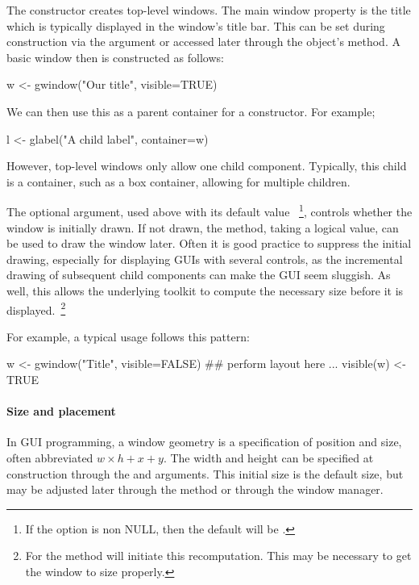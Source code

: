 The  constructor creates top-level windows. The
main window property is the title which is typically displayed in the
window's title bar. This can be set during construction via the
 argument or accessed later through the object's
 method. A basic window then is constructed as follows:

\begin{Schunk}
\begin{Sinput}
 w <- gwindow("Our title", visible=TRUE)
\end{Sinput}
\end{Schunk}
%

We can then use this as a parent container for a constructor. For example;
\begin{Schunk}
\begin{Sinput}
 l <- glabel("A child label", container=w)
\end{Sinput}
\end{Schunk}
%
However, top-level windows only allow one child component. Typically,
this child is a container, such as a box container, allowing for
multiple children.


The optional  argument, used above with its
default value ~\footnote{If the option
   is non NULL, then
  the default will be .}, controls whether the window is
initially drawn. If not drawn, the 
method, taking a logical value, can be used to draw the window later.
Often it is good practice to suppress the initial drawing, especially
for displaying GUIs with several controls, as the incremental drawing
of subsequent child components can make the GUI seem sluggish. As
well, this allows the underlying toolkit to compute the necessary size
before it is displayed.~\footnote{For  the 
method will initiate this recomputation. This may be necessary to get the
window to size properly.}

For example, a typical usage follows this pattern:
\begin{Schunk}
\begin{Sinput}
 w <- gwindow("Title", visible=FALSE)
 ## perform layout here ...
 visible(w) <- TRUE
\end{Sinput}
\end{Schunk}

\paragraph{Size and placement}
In GUI programming, a window geometry is a specification of position
and size, often abbreviated $w \times h + x + y$. The width and height
can be specified at construction through the 
and  arguments. This initial size is the
default size, but may be adjusted later through the
 method or through the window manager. 

